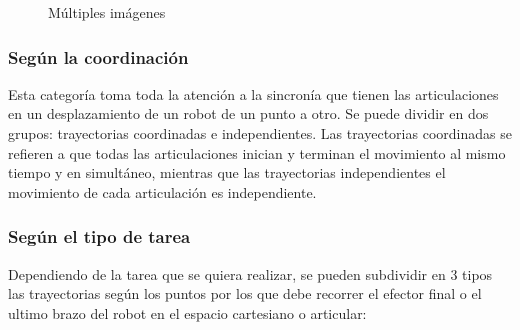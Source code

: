            \begin{figure}[htb]
             \centering
             \caption{Múltiples imágenes}
             \label{f:cap4_tray_6}
        \end{figure}            
            
            
            
        
        \subsubsection{Según la coordinación }
            Esta categoría toma toda la atención a la sincronía que tienen las articulaciones en un desplazamiento de un robot de un punto a otro. Se puede dividir en dos grupos: trayectorias coordinadas e independientes. Las trayectorias coordinadas se refieren a que todas las articulaciones inician y terminan el movimiento al mismo tiempo y en simultáneo, mientras que las trayectorias independientes el movimiento de cada articulación es independiente.
        
                 \newpage   

        
        
        \subsubsection{Según el tipo de tarea }
            Dependiendo de la tarea que se quiera realizar, se pueden subdividir en 3 tipos las trayectorias según los puntos por los que debe recorrer el efector final o el ultimo brazo del robot en el espacio cartesiano o articular:

